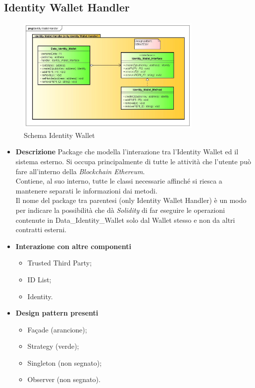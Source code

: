 \subsection{Identity Wallet Handler}
\begin{figure}[!h]
	\centering
	\includegraphics[width=0.8\textwidth]{immagini/identityWalletHandler}
	\caption{Schema Identity Wallet}
\end{figure}
\begin{itemize}
	\item \textbf{Descrizione}
	Package che modella l'interazione tra l'Identity Wallet ed il sistema esterno. Si occupa principalmente di tutte le attività che l'utente può fare all'interno della \textit{Blockchain Ethereum}.\\
	Contiene, al suo interno, tutte le classi necessarie affinché si riesca a mantenere separati le informazioni dai metodi.\\
	Il nome del package tra parentesi (only Identity Wallet Handler) è un modo per indicare la possibilità che dà \textit{Solidity} di far eseguire le operazioni contenute in Data\_Identity\_Wallet solo dal Wallet stesso e non da altri contratti esterni.
	\item \textbf{Interazione con altre componenti}
	\begin{itemize}
		\item Trusted Third Party;
		\item ID List;
		\item Identity.
	\end{itemize}
	\item \textbf{Design pattern presenti}
	\begin{itemize}
		\item Façade (arancione);
		\item Strategy (verde);
		\item Singleton (non segnato);
		\item Observer (non segnato).
	\end{itemize}
\end{itemize}
